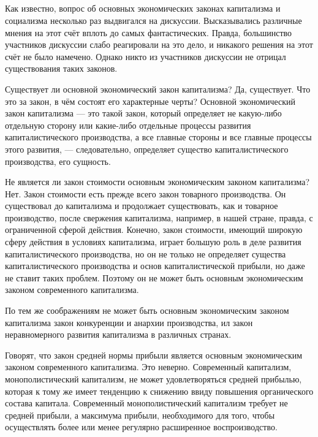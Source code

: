 \documentclass[12pt, a4paper, openany]{book}
\begin{document}
\subsection[7. Вопрос об основных экономических законах современного капитализма и социализма]{}





Как известно, вопрос об основных экономических законах капитализма и социализма несколько раз выдвигался на дискуссии. Высказывались различные мнения на этот счёт вплоть до самых фантастических. Правда, большинство участников дискуссии слабо реагировали на это дело, и никакого решения на этот счёт не было намечено. Однако никто из участников дискуссии не отрицал существования таких законов.



Существует ли основной экономический закон капитализма? Да, существует. Что это за закон, в чём состоят его характерные черты? Основной экономический закон капитализма — это такой закон, который определяет не какую-либо отдельную сторону или какие-либо отдельные процессы развития капиталистического производства, а все главные стороны и все главные процессы этого развития, — следовательно, определяет существо капиталистического производства, его сущность.



Не является ли закон стоимости основным экономическим законом капитализма? Нет. Закон стоимости есть прежде всего закон товарного производства. Он существовал до капитализма и продолжает существовать, как и товарное производство, после свержения капитализма, например, в нашей стране, правда, с ограниченной сферой действия. Конечно, закон стоимости, имеющий широкую сферу действия в условиях капитализма, играет большую роль в деле развития капиталистического производства, но он не только не определяет существа капиталистического производства и основ капиталистической прибыли, но даже не ставит таких проблем. Поэтому он не может быть основным экономическим законом современного капитализма.



По тем же соображениям не может быть основным экономическим законом капитализма закон конкуренции и анархии производства, ил закон неравномерного развития капитализма в различных странах.



Говорят, что закон средней нормы прибыли является основным экономическим законом современного капитализма. Это неверно. Современный капитализм, монополистический капитализм, не может удовлетворяться средней прибылью, которая к тому же имеет тенденцию к снижению ввиду повышения органического состава капитала. Современный монополистический капитализм требует не средней прибыли, а максимума прибыли, необходимого для того, чтобы осуществлять более или менее регулярно расширенное воспроизводство.
\end{document}
